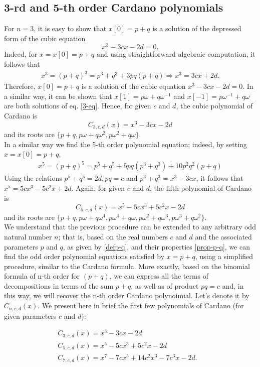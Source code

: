 \documentclass[11pt,reqno]{amsart}
\begin{document}
\subsection{3-rd and 5-th order Cardano polynomials}
For $n=3$, it is easy to show that $x[0]=p+q$ is a solution of the depressed form of the cubic equation \begin{equation}
    \label{3-eq}x^3-3cx-2d=0.
\end{equation} Indeed,  for $x=x[0]=p+q$ and using straightforward algebraic computation, it follows that
\begin{eqnarray}
    x^3=(p+q)^3 = p^3 + q^3 + 3pq(p+q)\Rightarrow x^3=3cx+2d.
\end{eqnarray}
Therefore,  $x[0]=p+q$ is a solution of the cubic equation $x^3-3cx-2d=0$. 
In a similar way, it can be shown that $x[1]=p\omega+q\omega^{-1}$ and $x[-1]=p\omega^{-1}+q\omega$ are both solutions of eq. \eqref{3-eq}.
Hence, for given $c$ and $d$, the cubic polynomial of Cardano  is $$C_{3,c,d}(x)=x^3-3cx-2d$$ and its roots are $\{p+q,p\omega+q\omega^{2},p\omega^{2}+q\omega \}$.
\\In a similar way we find the 5-th order polynomial equation; indeed, by setting $x=x[0]=p+q,$
\begin{eqnarray}\nonumber 
    x^5=(p+q)^5 = p^5+q^5+5pq(p^3+q^3)+10p^2q^2(p+q)
\end{eqnarray}
Using the relations $p^5+q^5=2d, pq=c$ and $p^3+q^3=x^3-3cx$, it follows that
$x^5=5cx^3-5c^2x+2d.$ 
Again,  for given $c$ and $d$,  the fifth polynomial of Cardano  is $$C_{5,c,d}(x)=x^5-5cx^3+5c^2x-2d$$ and its roots are $\{p+q,p\omega+q\omega^{4},p\omega^{4}+q\omega, p\omega^2+q\omega^{3}, p\omega^3+q\omega^{2} \}$.
\\We understand that the previous procedure can be extended to any arbitrary odd natural number $n$; that is, based on the real numbers $c$ and $d$  and the associated parameters $p$ and $q$, as given by \eqref{defp-q}, and their properties \eqref{prop-p-q},  we can find the odd order polynomial equations satisfied by $x=p+q$, using a  simplified procedure, similar to the Cardano formula. More exactly, based on the binomial formula of n-th order for $(p+q)$, we can express  all the terms of decompositions in terms of the sum $p+q$, as well as of product $pq=c$ and, in this way, we will recover the n-th order Cardano  polynoimial. Let's denote it by $C_{n,c,d}(x)$.   We present here in brief the first few polynomials of Cardano  (for given parameters $c$ and $d$):

\begin{eqnarray}
    C_{3,c,d}(x)=x^3 - 3cx - 2d  &\\
    C_{5,c,d}(x)=x^5 - 5cx^3 + 5c^2x - 2d  &\\
    C_{7,c,d}(x)=x^7 - 7cx^5 + 14c^2x^3 - 7c^3x - 2d .
\end{eqnarray} 
\end{document}

